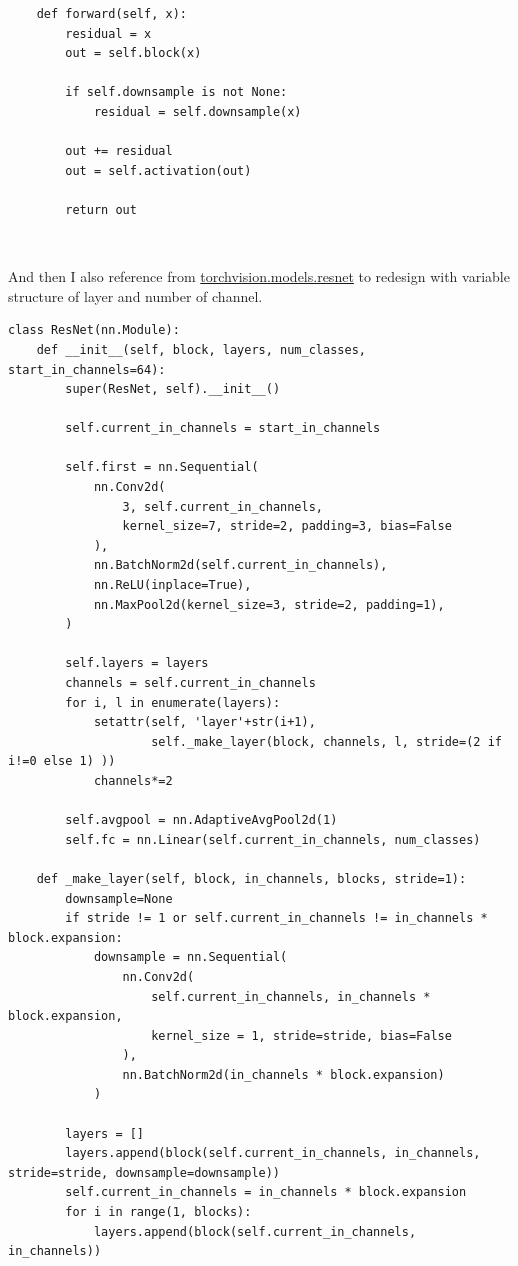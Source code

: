 \documentclass[12pt]{article}
\begin{document}
\begin{verbatim}
    def forward(self, x):
        residual = x
        out = self.block(x)
        
        if self.downsample is not None:
            residual = self.downsample(x)
        
        out += residual
        out = self.activation(out)
        
        return out
\end{verbatim}
\par \ \par
And then I also reference from  \href{https://pytorch.org/docs/0.4.0/_modules/torchvision/models/resnet.html}{torchvision.models.resnet} to redesign with variable structure of layer and number of channel.

\begin{verbatim}
class ResNet(nn.Module):
    def __init__(self, block, layers, num_classes, start_in_channels=64):
        super(ResNet, self).__init__()
        
        self.current_in_channels = start_in_channels
        
        self.first = nn.Sequential(
            nn.Conv2d(
                3, self.current_in_channels,
                kernel_size=7, stride=2, padding=3, bias=False
            ),
            nn.BatchNorm2d(self.current_in_channels),
            nn.ReLU(inplace=True),
            nn.MaxPool2d(kernel_size=3, stride=2, padding=1),
        )
        
        self.layers = layers
        channels = self.current_in_channels
        for i, l in enumerate(layers):
            setattr(self, 'layer'+str(i+1), 
                    self._make_layer(block, channels, l, stride=(2 if i!=0 else 1) ))
            channels*=2
        
        self.avgpool = nn.AdaptiveAvgPool2d(1)
        self.fc = nn.Linear(self.current_in_channels, num_classes)
            
    def _make_layer(self, block, in_channels, blocks, stride=1):
        downsample=None
        if stride != 1 or self.current_in_channels != in_channels * block.expansion:
            downsample = nn.Sequential(
                nn.Conv2d(
                    self.current_in_channels, in_channels * block.expansion,
                    kernel_size = 1, stride=stride, bias=False
                ),
                nn.BatchNorm2d(in_channels * block.expansion)
            )
        
        layers = []
        layers.append(block(self.current_in_channels, in_channels, stride=stride, downsample=downsample))
        self.current_in_channels = in_channels * block.expansion
        for i in range(1, blocks):
            layers.append(block(self.current_in_channels, in_channels))
        

\end{verbatim}
\end{document}
